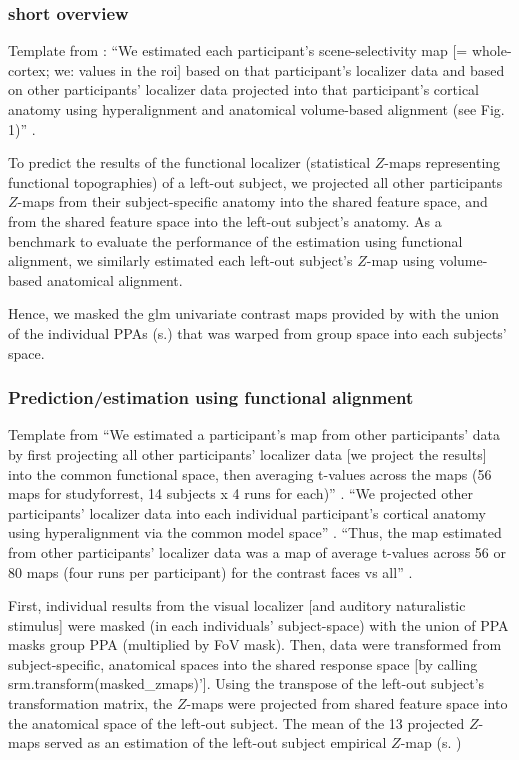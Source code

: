\subsubsection{short overview}
%
Template from \citet{jiahui2020predicting}: ``We estimated each participant's
scene-selectivity map [= whole-cortex; we: values in the \ac{roi}] based on that
participant's localizer data and based on other participants' localizer data
projected into that participant's cortical anatomy using hyperalignment and
anatomical volume-based alignment (see Fig. 1)'' \citep{jiahui2020predicting}.

%
To predict the results of the functional localizer (statistical $Z$-maps
representing functional topographies) of a left-out subject, we projected all
other participants $Z$-maps from their subject-specific anatomy into the shared
feature space, and from the shared feature space into the left-out subject's
anatomy.
%
As a benchmark to evaluate the performance of the estimation using functional
alignment, we similarly estimated each left-out subject's $Z$-map using
volume-based anatomical alignment.

Hence, we masked the \ac{glm} univariate contrast maps provided by
\citet{sengupta2016extensiondata} with the union of the individual PPAs
(s.\citep{haeusler2022processing}) that was warped from group space into each
subjects' space.


\subsubsection{Prediction/estimation using functional alignment}

Template from \citet{jiahui2020predicting} ``We estimated a participant's map
from other participants' data by first projecting all other participants'
localizer data [we project the results] into the common functional space, then
averaging t-values across the maps (56 maps for studyforrest, 14 subjects x 4
runs for each)'' \citep{jiahui2020predicting}.
%
``We projected other participants' localizer data into each individual
participant's cortical anatomy using hyperalignment via the common model space''
\citep{jiahui2020predicting}.
%
``Thus, the map estimated from other participants' localizer data was a map of
average t-values across 56 or 80 maps (four runs per participant) for the
contrast faces vs all'' \citep{jiahui2020predicting}.

%
First, individual results from the visual localizer [and auditory naturalistic
stimulus] were masked (in each individuals' subject-space) with the union of PPA
masks group PPA (multiplied by FoV mask).
%
Then, data were transformed from subject-specific, anatomical spaces into the
shared response space [by calling srm.transform(masked\_zmaps)'].
%
Using the transpose of the left-out subject's transformation matrix, the
$Z$-maps were projected from shared feature space into the anatomical space of
the left-out subject.
%
The mean of the 13 projected $Z$-maps served as an estimation of the left-out
subject empirical $Z$-map (s. \citep{sengupta2016extension})



